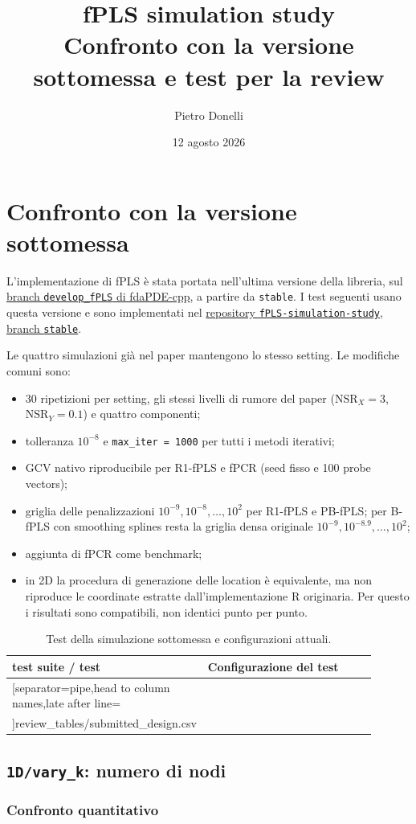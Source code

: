 \documentclass[11pt,a4paper]{article}
\title{fPLS simulation study\\Confronto con la versione sottomessa e test per la review}
\author{Pietro Donelli}
\date{12 agosto 2026}
\newcommand{\reviewdesigntable}[2][Test della simulazione sottomessa e configurazioni attuali.]{%
  \begin{table}[H]
  \centering
  \footnotesize
  \begin{tabular}{>{\raggedright\arraybackslash\ttfamily\scriptsize}p{0.29\linewidth}>{\raggedright\arraybackslash}p{0.61\linewidth}}
  \toprule
  \textbf{\rmfamily test suite / test} & \textbf{\rmfamily Configurazione del test} \\
  \midrule
  \csvreader[separator=pipe,head to column names,late after line=\\]{#2}{}{%
    \csvcoli & \csvcolii
  }
  \bottomrule
  \end{tabular}
  \caption{#1}
  \end{table}
}
\begin{document}
\maketitle

\section{Confronto con la versione sottomessa}

L'implementazione di fPLS è stata portata nell'ultima versione della libreria, sul
\href{https://github.com/fdaPDE/fdaPDE-cpp/tree/develop_fPLS}{branch \texttt{develop\_fPLS}
di fdaPDE-cpp}, a partire da \texttt{stable}. I test seguenti usano questa versione e sono
implementati nel
\href{https://github.com/donellipietro/fPLS-simulation-study/tree/stable}{repository
\texttt{fPLS-simulation-study}, branch \texttt{stable}}.

Le quattro simulazioni già nel paper mantengono lo stesso setting. Le modifiche comuni sono:
\begin{itemize}
  \item 30 ripetizioni per setting, gli stessi livelli di rumore del paper
  ($\mathrm{NSR}_X=3$, $\mathrm{NSR}_Y=0.1$) e quattro componenti;
  \item tolleranza $10^{-8}$ e \texttt{max\_iter = 1000} per tutti i metodi iterativi;
  \item GCV nativo riproducibile per R1-fPLS e fPCR (seed fisso e 100 probe vectors);
  \item griglia delle penalizzazioni $10^{-9},10^{-8},\ldots,10^2$ per R1-fPLS e
  PB-fPLS; per B-fPLS con smoothing splines resta la griglia densa originale
  $10^{-9},10^{-8.9},\ldots,10^2$;
  \item aggiunta di fPCR come benchmark;
  \item in 2D la procedura di generazione delle location è equivalente, ma non riproduce
  le coordinate estratte dall'implementazione R originaria. Per questo i
  risultati sono compatibili, non identici punto per punto.
\end{itemize}

\reviewdesigntable{review_tables/submitted_design.csv}

\subsection{\texttt{1D/vary\_k}: numero di nodi}

\subsubsection{Confronto quantitativo}
\end{document}
